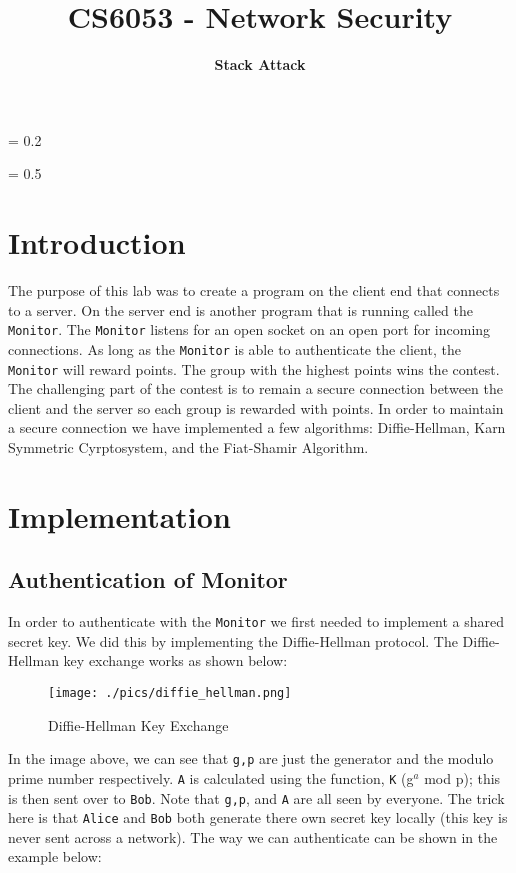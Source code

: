 \documentclass[10pt]{article}
\title{
    \vspace{2in}
    \textmd{\textbf{CS6053 - Network Security}}\\
    \vspace{4in}
}
\author{\textbf{Stack Attack}}
\begin{document}
\maketitle
\newpage
\parskip = 0.2\baselineskip
\newpage
\tableofcontents
\listoffigures
\listoftables
\parskip = 0.5\baselineskip
\newpage

\section{Introduction}
The purpose of this lab was to create a program on the client end that connects
to a server. On the server end is another program that is running called the
\texttt{Monitor}. The \texttt{Monitor} listens for an open socket on an open
port for incoming connections. As long as the \texttt{Monitor} is able to
authenticate the client, the \texttt{Monitor} will reward points. The group
with the highest points wins the contest. The challenging part of the contest
is to remain a secure connection between the client and the server so each
group is rewarded with points. In order to maintain a secure connection we have
implemented a few algorithms: Diffie-Hellman, Karn Symmetric Cyrptosystem, and
the Fiat-Shamir Algorithm.

\section{Implementation}

\subsection{Authentication of Monitor}
In order to authenticate with the \texttt{Monitor} we first needed to implement
a shared secret key. We did this by implementing the Diffie-Hellman protocol. The
Diffie-Hellman key exchange works as shown below:
\begin{figure}[H]
    \centering
    \texttt{[image: ./pics/diffie\_hellman.png]}
    \caption{Diffie-Hellman Key Exchange}
\end{figure}
In the image above, we can see that \texttt{g,p} are just the generator and
the modulo prime number respectively. \texttt{A} is calculated using the
function, \texttt{K} (g$^{a}$ mod p); this is then sent over to \texttt{Bob}.
Note that \texttt{g,p}, and \texttt{A} are all seen by everyone. The trick here
is that \texttt{Alice} and \texttt{Bob} both generate there own secret key
locally (this key is never sent across a network). The way we can authenticate
can be shown in the example below:
\end{document}
